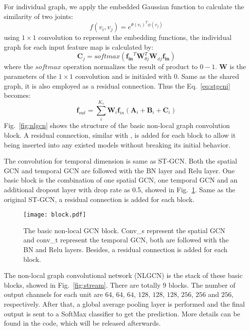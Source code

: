 \documentclass[10pt,twocolumn,letterpaper]{article}
\begin{document}
    For individual graph, we apply the embedded Gaussian function to calculate the similarity of two joints:
    \begin{equation}
    \mathit{f}(v_i,v_j)=e^{\theta(v_i)^T\phi(v_j)}
    \end{equation}
    using $1\times 1$ convolution to represent the embedding functions, the individual graph for each input feature map is calculated by:
    \begin{equation}
    \mathbf{C}_j = softmax(\mathbf{f_{in}}^T\mathbf{W}^T_{\theta j}\mathbf{W}_{\phi j} \mathbf{f_{in}})
    \end{equation}
    where the $softmax$ operation normalizes the result of product to $0-1$. $\mathbf{W}$ is the parameters of the $1\times 1$ convolution and is initialed with 0. Same as the shared graph, it is also employed as a residual connection. Thus the Eq.~\ref{eq:stgcni} becomes:
    \begin{equation}
    \label{eq:nlstgcn}
    \mathbf{f}_{out} = \sum_i^{K_v} \mathbf{W}_i \mathbf{f}_{in} ({\mathbf{A}_{i}}+{\mathbf{B}_{i}}+{\mathbf{C}_{i}})
    \end{equation}
    Fig.~\ref{fig:nlgcn} shows the structure of the basic non-local graph convolution block. A residual connection, similar with \cite{he_deep_2016}, is added for each block to allow it being inserted into any existed models without breaking its initial behavior.
    


    The convolution for temporal dimension is same as ST-GCN. Both the spatial GCN and temporal GCN are followed with the BN layer and Relu layer. One basic block is the combination of one spatial GCN, one temporal GCN and an additional dropout layer with drop rate as 0.5, showed in Fig.~\ref{fig:block}. Same as the original ST-GCN, a residual connection is added for each block.
    
\begin{figure}[!htb]
	\begin{center}
	\texttt{[image: block.pdf]}
	\caption{The basic non-local GCN block. Conv\_s represent the spatial GCN and conv\_t represent the temporal GCN, both are followed with the BN and Relu layers. Besides, a residual connection is added for each block.}
	\label{fig:block}	
	\end{center}
	\end{figure}

    The non-local graph convolutional network (NLGCN) is the stack of these basic blocks, showed in Fig.~\ref{fig:stream}. There are totally $9$ blocks. The number of output channels for each unit are $64$, $64$, $64$, $128$, $128$, $128$, $256$, $256$ and $256$, respectively. After that, a global average pooling layer is performed and the final output is sent to a SoftMax classifier to get the prediction. More details can be found in the code, which will be released afterwards.
    
\end{document}

